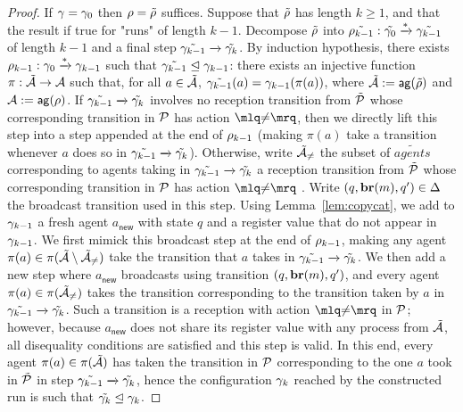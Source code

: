 \begin{proof}
If $\gamma = \gamma_0$ then $\rho = \tilde{\rho}$ suffices. Suppose that $\tilde{\rho}$ has length $k \geq 1$, and that the result if true for "runs" of length $k-1$. Decompose $\tilde{\rho}$ into $\tilde{\rho_{k-1}}: \tilde{\gamma_0} \xrightarrow{*} \tilde{\gamma_{k-1}}$ of length $k-1$ and a final step $\tilde{\gamma_{k-1}} \xrightarrow{} \tilde{\gamma_k}$. 
By induction hypothesis, there exists $\rho_{k-1}: \gamma_0 \xrightarrow{*} \gamma_{k-1}$ such that $\tilde{\gamma_{k-1}} \trianglelefteq \gamma_{k-1}$: there exists an injective function $\pi : \tilde{\mathcal{A}} \rightarrow \mathcal{A}$
 such that, for all $a \in \tilde{\mathcal{A}}$, $\tilde{\gamma_{k-1}}(a) = \gamma_{k-1}(\pi(a))$, where $\tilde{\mathcal{A}} := \mathsf{ag}(\tilde{\rho})$ and $\mathcal{A} := \mathsf{ag}(\rho)$. If $\tilde{\gamma_{k-1}} \xrightarrow{} \tilde{\gamma_k}$ involves no reception transition from $\tilde{\mathcal{P}}$ whose corresponding transition in $\mathcal{P}$ has action $\quotemarks{\diseqtestact}$, then we directly lift this step into a step appended at the end of $\rho_{k-1}$ (making $\pi(a)$ take a transition whenever $a$ does so in $\tilde{\gamma_{k-1}} \xrightarrow{} \tilde{\gamma_k}$). Otherwise, write $\tilde{\mathcal{A}}_{{\ne}}$ the subset of $\tilde{agents}$ corresponding to agents taking in $\tilde{\gamma_{k-1}} \xrightarrow{} \tilde{\gamma_k}$ a reception transition from $\tilde{\mathcal{P}}$ whose corresponding transition in $\mathcal{P}$ has action $\quotemarks{\diseqtestact}$ . Write $(q, \textbf{br}(m), q') \in \Delta$ the broadcast transition used in this step.  Using Lemma~\ref{lem:copycat}, we add to $\gamma_{k-1}$ a fresh agent $a_{\mathsf{new}}$ with state $q$ and a register value that do not appear in $\gamma_{k-1}$. 
We first mimick this broadcast step at the end of $\rho_{k-1}$, making any agent $\pi(a) \in \pi(\tilde{\mathcal{A}} \setminus \tilde{\mathcal{A}}_{{\ne}})$ take the transition that $a$ takes in $\tilde{\gamma_{k-1}} \xrightarrow{} \tilde{\gamma_k}$. We then add a new step where $a_{\mathsf{new}}$ broadcasts using transition $(q, \textbf{br}(m), q')$, and every agent $\pi(a) \in \pi(\tilde{\mathcal{A}}_{{\ne}})$ takes the transition corresponding to the transition taken by $a$ in $\tilde{\gamma_{k-1}} \xrightarrow{} \tilde{\gamma_k}$. Such a transition is a reception with action $\quotemarks{\diseqtestact}$ in $\mathcal{P}$; however, because $a_{\mathsf{new}}$ does not share its register value with any process from $\tilde{\mathcal{A}}$, all disequality conditions are satisfied and this step is valid. In this end, every agent $\pi(a) \in \pi(\tilde{\mathcal{A}})$ has taken the transition in $\mathcal{P}$ corresponding to the one $a$ took in $\tilde{\mathcal{P}}$ in step $\tilde{\gamma_{k-1}} \xrightarrow{} \tilde{\gamma_k}$, hence the configuration $\gamma_k$ reached by the constructed run is such that $\tilde{\gamma_k} \trianglelefteq \gamma_k$. 
\end{proof}

